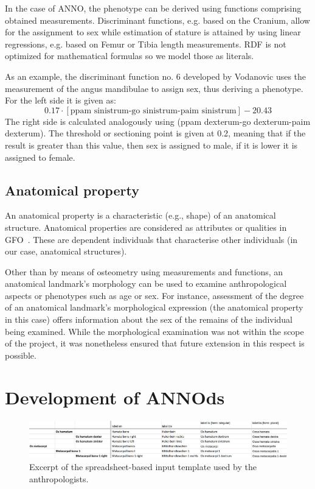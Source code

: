 \documentclass[sw]{iosart2x}
\begin{document}
In the case of ANNO, the phenotype can be derived using functions comprising obtained measurements.
Discriminant functions, e.g. based on the Cranium, allow for the assignment to sex while estimation of stature is attained by using linear regressions, e.g. based on Femur or Tibia length measurements.
RDF is not optimized for mathematical formulas so we model those as literals.

As an example, the discriminant function no. 6 developed by Vodanovic uses the measurement of the angus mandibulae to assign sex, thus deriving a phenotype.
For the left side it is given as:
\[
0.17 \cdot [\text{ppam sinistrum-go sinistrum-paim sinistrum}] - 20.43
\]
The right side is calculated analogously using (ppam dexterum-go dexterum-paim dexterum).
The threshold or sectioning point is given at 0.2, meaning that if the result is greater than this value, then sex is assigned to male, if it is lower it is assigned to female.

\subsection{Anatomical property}
An anatomical property is a characteristic (e.g., shape) of an anatomical structure.
Anatomical properties are considered as attributes or qualities in GFO~\citep{gfoarchitecture}.
These are dependent individuals that characterise other individuals (in our case, anatomical structures).

Other than by means of osteometry using measurements and functions, an anatomical landmark's morphology can be used to examine anthropological aspects or phenotypes such as age or sex.
For instance, assessment of the degree of an anatomical landmark's morphological expression (the anatomical property in this case) offers information about the sex of the remains of the individual being examined.
While the morphological examination was not within the scope of the project, it was nonetheless ensured that future extension in this respect is possible.

\section{Development of ANNOds}\label{sec:domain}

\begin{figure}[h!t]
\includegraphics[width=\textwidth]{img/smog.png}
\caption{Excerpt of the spreadsheet-based input template used by the anthropologists.}\label{fig:smog}
\end{figure}
\end{document}
